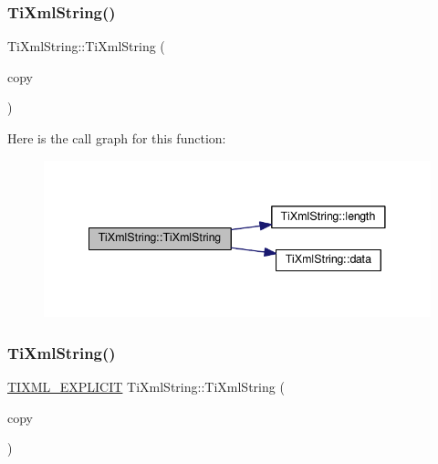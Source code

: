 \mbox{\label{class_ti_xml_string_ac80fe17693a438c9ab2591664743fcb6}} 
\subsubsection{\texorpdfstring{Ti\+Xml\+String()}{TiXmlString()}\hspace{0.1cm}{\footnotesize\ttfamily [2/4]}}
{\footnotesize\ttfamily Ti\+Xml\+String\+::\+Ti\+Xml\+String (\begin{DoxyParamCaption}\item[{const \hyperlink{class_ti_xml_string}{Ti\+Xml\+String} \&}]{copy }\end{DoxyParamCaption})\hspace{0.3cm}{\ttfamily [inline]}}

Here is the call graph for this function\+:
\nopagebreak
\begin{figure}[H]
\begin{center}
\leavevmode
\includegraphics[width=341pt]{class_ti_xml_string_ac80fe17693a438c9ab2591664743fcb6_cgraph}
\end{center}
\end{figure}
\mbox{\label{class_ti_xml_string_aa3b32bd2891a757c9f36c21db44c81d2}} 
\subsubsection{\texorpdfstring{Ti\+Xml\+String()}{TiXmlString()}\hspace{0.1cm}{\footnotesize\ttfamily [3/4]}}
{\footnotesize\ttfamily \hyperlink{tinystr_8h_ae341476cd6b94ee32e3e93110a759581}{T\+I\+X\+M\+L\+\_\+\+E\+X\+P\+L\+I\+C\+IT} Ti\+Xml\+String\+::\+Ti\+Xml\+String (\begin{DoxyParamCaption}\item[{const char $\ast$}]{copy }\end{DoxyParamCaption})\hspace{0.3cm}{\ttfamily [inline]}}

